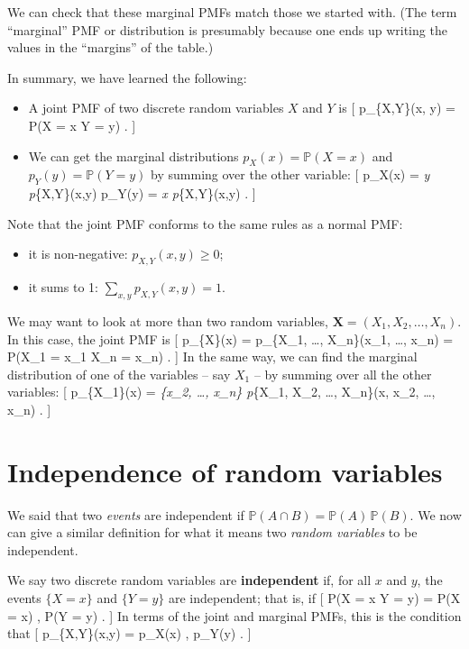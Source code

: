 \documentclass[
  letterpaper,
  DIV=11,
  numbers=noendperiod]{scrreprt}
\providecommand{\tightlist}{%
  \setlength{\itemsep}{0pt}\setlength{\parskip}{0pt}}\usepackage{longtable,booktabs,array}
\theoremstyle{remark}
\begin{document}
We can check that these marginal PMFs match those we started with. (The
term ``marginal'' PMF or distribution is presumably because one ends up
writing the values in the ``margins'' of the table.)

In summary, we have learned the following:

\begin{itemize}
\tightlist
\item
  A joint PMF of two discrete random variables \(X\) and \(Y\) is {[}
  p\_\{X,Y\}(x, y) = \mathbb P(X = x  Y = y) . {]}
\item
  We can get the marginal distributions \(p_X(x) = \mathbb P(X = x)\)
  and \(p_Y(y) = \mathbb P(Y = y)\) by summing over the other variable:
  {[} p\_X(x) = \sum\emph{y p}\{X,Y\}(x,y) \qquad p\_Y(y) = \sum\emph{x
  p}\{X,Y\}(x,y) . {]}
\end{itemize}

Note that the joint PMF conforms to the same rules as a normal PMF:

\begin{itemize}
\tightlist
\item
  it is non-negative: \(p_{X,Y}(x,y) \geq 0\);
\item
  it sums to 1: \(\displaystyle\sum_{x,y} p_{X,Y}(x,y) = 1\).
\end{itemize}

We may want to look at more than two random variables,
\(\mathbf X = (X_1, X_2, \dots, X_n)\). In this case, the joint PMF is
{[} p\_\{\mathbf X\}(\mathbf x) = p\_\{X\_1, \dots, X\_n\}(x\_1, \dots,
x\_n) = \mathbb P(X\_1 = x\_1  \cdots {} X\_n =
x\_n) . {]} In the same way, we can find the marginal distribution of
one of the variables -- say \(X_1\) -- by summing over all the other
variables: {[} p\_\{X\_1\}(x) = \sum\emph{\{x\_2, \dots, x\_n\}
p}\{X\_1, X\_2, \dots, X\_n\}(x, x\_2, \dots, x\_n) . {]}

\hypertarget{independence-rv}{%
\section{Independence of random variables}\label{independence-rv}}

We said that two \emph{events} are independent if
\(\mathbb P(A \cap B) = \mathbb P(A)\, \mathbb P(B)\). We now can give a
similar definition for what it means two \emph{random variables} to be
independent.

We say two discrete random variables are \textbf{independent} if, for
all \(x\) and \(y\), the events \(\{X = x\}\) and \(\{Y = y\}\) are
independent; that is, if {[} \mathbb P(X = x  Y = y) =
\mathbb P(X = x) , \mathbb P(Y = y) . {]} In terms of the joint and
marginal PMFs, this is the condition that {[} p\_\{X,Y\}(x,y) = p\_X(x)
, p\_Y(y) . {]}
\end{document}
